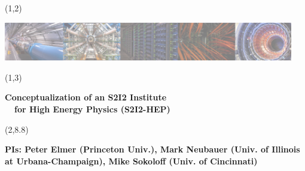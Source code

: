 \documentclass[final]{beamer}
\begin{document}
\begin{frame}{} 




\begin{textblock}{84.0}(1,2)
\begin{center}
\includegraphics[width=0.95\textwidth]{images/s2i2-banner-50percent.png}
\end{center}
\end{textblock}

\begin{textblock}{84.0}(1,3)
\begin{center}
\begin{Huge}
\textbf{
Conceptualization of an S2I2 Institute \\
~~for High Energy Physics (S2I2-HEP)
}
\end{Huge}
\end{center}
\end{textblock}

\begin{textblock}{84.0}(2,8.8)
\begin{center}
\begin{Large}
\textbf{
PIs: Peter Elmer (Princeton Univ.), Mark Neubauer (Univ. of Illinois \\ 
at Urbana-Champaign), Mike Sokoloff (Univ. of Cincinnati)
}
\end{Large}
\end{center}
\end{textblock}


\end{frame}
\end{document}
